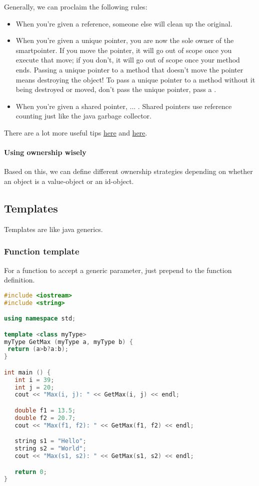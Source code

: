 Generally, we can proclaim the following rules:
\begin{itemize}
    \item When you're given a reference, someone else will clean up the original. 
    \item When you're given a unique pointer, you are now the sole owner of the smartpointer. If you move the pointer, it will go out of scope once you execute that move; if you don't, it will go out of scope once your method ends. Passing a unique pointer to a method that doesn't move the pointer means destroying the object! To pass a unique pointer to a method without it being destroyed or moved, don't pass the unique pointer, pass a .
    \item When you're given a shared pointer, ... . Shared pointers use reference counting just like the java garbage collector.  
\end{itemize}
There are a lot more useful tips \hyperlink{https://herbsutter.com/2013/06/05/gotw-91-solution-smart-pointer-parameters/}{here} and \hyperlink{https://stackoverflow.com/questions/8114276/how-do-i-pass-a-unique-ptr-argument-to-a-constructor-or-a-function}{here}.


\paragraph{Using ownership wisely} Based on this, we can define different ownership strategies depending on whether an object is a value-object or an id-object. 


\subsection{Templates}
Templates are like java generics. 

\subsubsection{Function template}

For a function to accept a generic parameter, just prepend  to the function definition. 

\begin{lstlisting}[language=c++]
#include <iostream>
#include <string>

using namespace std;

template <class myType>
myType GetMax (myType a, myType b) {
 return (a>b?a:b);
}

int main () {
   int i = 39;
   int j = 20;
   cout << "Max(i, j): " << GetMax(i, j) << endl; 

   double f1 = 13.5; 
   double f2 = 20.7; 
   cout << "Max(f1, f2): " << GetMax(f1, f2) << endl; 

   string s1 = "Hello"; 
   string s2 = "World"; 
   cout << "Max(s1, s2): " << GetMax(s1, s2) << endl; 

   return 0;
}
\end{lstlisting}


